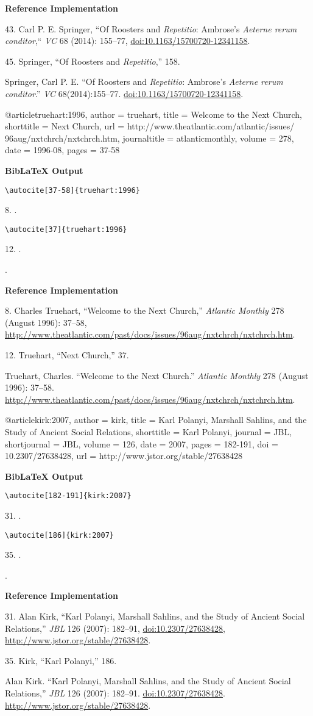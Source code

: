 \documentclass[a4paper]{article}
\newcommand\citetest[5]{%
  {\textbf{BibLaTeX Output}\par
   \nobreak
   \texttt{\textbackslash autocite[#2]\{#5\}}\par
   \color{biblatex-colour}
   #1. \cite[#2]{#5}.\par
   \color{black}
   \texttt{\textbackslash autocite[#4]\{#5\}}\par
   \color{biblatex-colour}
   #3. \cite[#4]{#5}.\par
   \hangindent\bibindent\bibentrycite{#5}.\par}}
\newenvironment{refimp}{%
  \begin{minipage}{\linewidth}
    \setlength{\parskip}{1ex}
    \textbf{Reference Implementation}\par
    \nobreak
    \color{reference-colour}
}{\end{minipage}}
\newenvironment{vb}{%
  \setlength{\parskip}{0pt}
  \verbatim}{\endverbatim}
\begin{document}
\begin{refimp}
  43. Carl P. E. Springer, “Of Roosters and \emph{Repetitio}: Ambrose’s
  \emph{Aeterne rerum conditor},“ \emph{VC} 68 (2014): 155–77,
  \url{doi:10.1163/15700720-12341158}.

  45. Springer, “Of Roosters and \emph{Repetitio},” 158.

  \hangindent\bibindent Springer, Carl P. E. “Of Roosters and
  \emph{Repetitio}: Ambrose’s \emph{Aeterne rerum conditor}.” \emph{VC}
  68(2014):155–77. \url{doi:10.1163/15700720-12341158}.
\end{refimp}

\begin{vb}
@article{truehart:1996,
  author = truehart,
  title = {Welcome to the Next Church},
  shorttitle = {Next Church},
  url = {http://www.theatlantic.com/atlantic/issues/
         96aug/nxtchrch/nxtchrch.htm},
  journaltitle = atlanticmonthly,
  volume = {278},
  date = {1996-08},
  pages = {37-58}
}
\end{vb}

\citetest{8}{37-58}{12}{37}{truehart:1996}

\begin{refimp}
  8. Charles Truehart, “Welcome to the Next Church,” \emph{Atlantic Monthly}
  278 (August 1996): 37–58,
  \url{http://www.theatlantic.com/past/docs/issues/96aug/nxtchrch/nxtchrch.htm}.

  12. Truehart, “Next Church,” 37.
 
  \hangindent\bibindent Truehart, Charles. “Welcome to the Next Church.”
  \emph{Atlantic Monthly} 278 (August
  1996): 37–58.
  \url{http://www.theatlantic.com/past/docs/issues/96aug/nxtchrch/nxtchrch.htm}.
\end{refimp}

\begin{vb}
@article{kirk:2007,
  author = kirk,
  title = {Karl Polanyi, Marshall Sahlins, and the Study of
           Ancient Social Relations},
  shorttitle = {Karl Polanyi},
  journal = JBL,
  shortjournal = {JBL},
  volume = {126},
  date = {2007},
  pages = {182-191},
  doi = {10.2307/27638428},
  url = {http://www.jstor.org/stable/27638428}
}
\end{vb}

\citetest{31}{182-191}{35}{186}{kirk:2007}

\begin{refimp}
  31. Alan Kirk, “Karl Polanyi, Marshall Sahlins, and the Study of Ancient Social
  Relations,” \emph{JBL} 126 (2007): 182–91, \url{doi:10.2307/27638428},
  \url{http://www.jstor.org/stable/27638428}.

  35. Kirk, “Karl Polanyi,” 186.

  \hangindent\bibindent Alan Kirk. “Karl Polanyi, Marshall Sahlins, and the
  Study of Ancient Social Relations,” \emph{JBL} 126 (2007): 182–91.
  \url{doi:10.2307/27638428}. \url{http://www.jstor.org/stable/27638428}.
\end{refimp}
\end{document}
